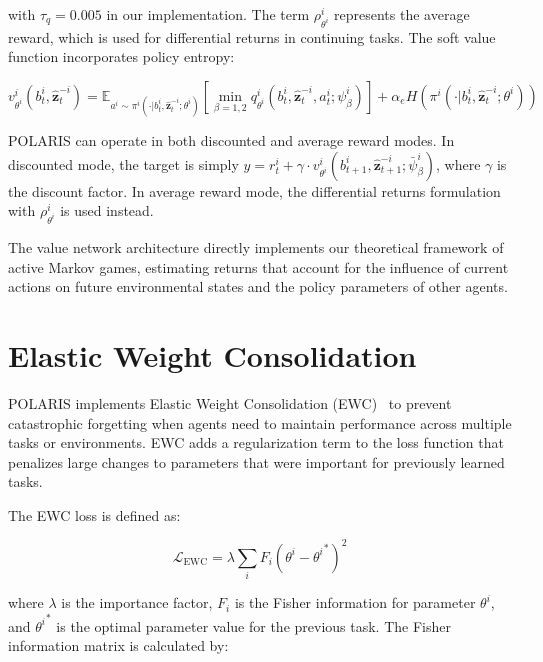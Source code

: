 with $\tau_{q} = 0.005$ in our implementation. The term $\rho^{i}_{\theta^i}$ represents the average reward, which is used for differential returns in continuing tasks. The soft value function incorporates policy entropy:

\begin{equation}
    v^{i}_{\theta^i}(b^{i}_{t}, \hat{\boldsymbol{z}}^{-i}_{t}) = \mathbb{E}_{a^i \sim \pi^i(\cdot|b^i_t,\hat{\boldsymbol{z}}^{-i}_t;\theta^i)}[\min_{\beta=1,2}q^{i}_{\theta^i}(b^{i}_{t}, \hat{\boldsymbol{z}}^{-i}_{t}, a^{i}_{t}; \psi^{i}_{\beta})] + \alpha_e H(\pi^{i}(\cdot|b^{i}_{t}, \hat{\boldsymbol{z}}^{-i}_{t}; \theta^{i}))
\end{equation}

POLARIS can operate in both discounted and average reward modes. In discounted mode, the target is simply $y = r^{i}_{t} + \gamma \cdot v^{i}_{\theta^i}(b^{i}_{t+1}, \hat{\boldsymbol{z}}^{-i}_{t+1}; \bar{\psi}^{i}_{\beta})$, where $\gamma$ is the discount factor. In average reward mode, the differential returns formulation with $\rho^{i}_{\theta^i}$ is used instead.

The value network architecture directly implements our theoretical framework of active Markov games, estimating returns that account for the influence of current actions on future environmental states and the policy parameters of other agents.

\section{Elastic Weight Consolidation}

POLARIS implements Elastic Weight Consolidation (EWC)~\cite{kirkpatrick2017overcoming} to prevent catastrophic forgetting when agents need to maintain performance across multiple tasks or environments. EWC adds a regularization term to the loss function that penalizes large changes to parameters that were important for previously learned tasks.

The EWC loss is defined as:

\begin{equation}
    \mathcal{L}_{\text{EWC}} = \lambda \sum_{i} F_i (\theta^i - {\theta^i}^*)^2
\end{equation}

where $\lambda$ is the importance factor, $F_i$ is the Fisher information for parameter $\theta^i$, and ${\theta^i}^*$ is the optimal parameter value for the previous task. The Fisher information matrix is calculated by:

